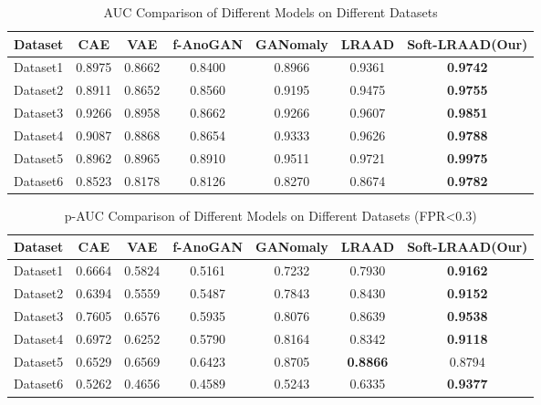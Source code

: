 \documentclass{article}
\begin{document}
\begin{table}[H]
    \centering
    \caption{AUC Comparison of Different Models on Different Datasets}
    \begin{tabular}{ccccccc}
        \toprule
        Dataset & CAE & VAE & f-AnoGAN & GANomaly & LRAAD & Soft-LRAAD(Our) \\
        \midrule
        Dataset1 & 0.8975 & 0.8662 & 0.8400 & 0.8966 & 0.9361 & \textbf{0.9742} \\
        Dataset2 & 0.8911 & 0.8652 & 0.8560 & 0.9195 & 0.9475 & \textbf{0.9755} \\
        Dataset3 & 0.9266 & 0.8958 & 0.8662 & 0.9266 & 0.9607 & \textbf{0.9851} \\
        Dataset4 & 0.9087 & 0.8868 & 0.8654 & 0.9333 & 0.9626 & \textbf{0.9788} \\
        Dataset5 & 0.8962 & 0.8965 & 0.8910 & 0.9511 & 0.9721 & \textbf{0.9975} \\
        Dataset6 & 0.8523 & 0.8178 & 0.8126 & 0.8270 & 0.8674 & \textbf{0.9782} \\
        \bottomrule
    \end{tabular}
    \label{tab:auc}
\end{table}


\begin{table}[H]
    \centering
    \caption{p-AUC Comparison of Different Models on Different Datasets (FPR<0.3)}
    \begin{tabular}{ccccccc}
        \toprule
        Dataset & CAE & VAE & f-AnoGAN & GANomaly & LRAAD & Soft-LRAAD(Our) \\
        \midrule
        Dataset1 & 0.6664 & 0.5824 & 0.5161 & 0.7232 & 0.7930 & \textbf{0.9162} \\
        Dataset2 & 0.6394 & 0.5559 & 0.5487 & 0.7843 & 0.8430 & \textbf{0.9152} \\
        Dataset3 & 0.7605 & 0.6576 & 0.5935 & 0.8076 & 0.8639 & \textbf{0.9538} \\
        Dataset4 & 0.6972 & 0.6252 & 0.5790 & 0.8164 & 0.8342 & \textbf{0.9118} \\
        Dataset5 & 0.6529 & 0.6569 & 0.6423 & 0.8705 & \textbf{0.8866} & 0.8794 \\
        Dataset6 & 0.5262 & 0.4656 & 0.4589 & 0.5243 & 0.6335 & \textbf{0.9377} \\
        \bottomrule
    \end{tabular}
    \label{tab:p-auc-03}
\end{table}
\end{document}
